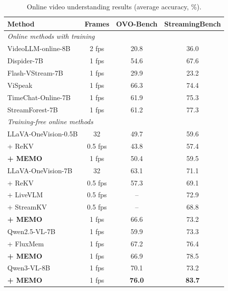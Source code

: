 \begin{table}[t]
\centering
\caption{Online video understanding results (average accuracy, \%).}
\label{tab:memo-online-results}
\begin{tabular}{lccc}
\hline
Method & Frames & OVO-Bench & StreamingBench \\
\hline
\multicolumn{4}{l}{\textit{Online methods with training}} \\
VideoLLM-online-8B & 2 fps & 20.8 & 36.0 \\
Dispider-7B & 1 fps & 54.6 & 67.6 \\
Flash-VStream-7B & 1 fps & 29.9 & 23.2 \\
ViSpeak & 1 fps & 66.3 & 74.4 \\
TimeChat-Online-7B & 1 fps & 61.9 & 75.3 \\
StreamForest-7B & 1 fps & 61.2 & 77.3 \\
\hline
\multicolumn{4}{l}{\textit{Training-free online methods}} \\
LLaVA-OneVision-0.5B & 32 & 49.7 & 59.6 \\
\quad + ReKV & 0.5 fps & 43.8 & 57.4 \\
\quad \textbf{+ MEMO} & 1 fps & 50.4 & 59.5 \\
LLaVA-OneVision-7B & 32 & 63.1 & 71.1 \\
\quad + ReKV & 0.5 fps & 57.3 & 69.1 \\
\quad + LiveVLM & 0.5 fps & -- & 72.9 \\
\quad + StreamKV & 0.5 fps & -- & 68.8 \\
\quad \textbf{+ MEMO} & 1 fps & 66.6 & 73.2 \\
Qwen2.5-VL-7B & 1 fps & 59.9 & 73.3 \\
\quad + FluxMem & 1 fps & 67.2 & 76.4 \\
\quad \textbf{+ MEMO} & 1 fps & 66.9 & 78.5 \\
Qwen3-VL-8B & 1 fps & 70.1 & 73.2 \\
\quad \textbf{+ MEMO} & 1 fps & \textbf{76.0} & \textbf{83.7} \\
\hline
\end{tabular}
\end{table}
